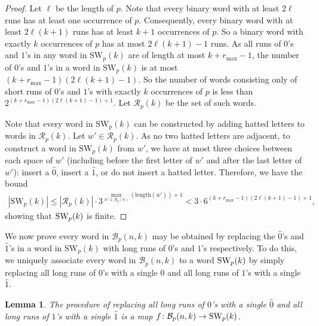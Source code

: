 \documentclass[11pt]{amsart}
\newtheorem{lemma}[theorem]{Lemma}
\newcommand{\hatted}[1]{\widehat{#1}}
\begin{document}
\begin{proof}
    Let $\ell$ be the length of $p$. Note that every binary word with at least $2\ell$ runs has at least one occurrence of $p$. Consequently, every binary word with at least $2\ell(k+1)$ runs has at least $k+1$ occurrences of $p$. So a binary word with exactly $k$ occurrences of $p$ has at most $2\ell(k+1)-1$ runs. As all runs of $0$'s and $1$'s in any word in $\text{SW}_{p}(k)$ are of length at most $k+r_{\max}-1$, the number of $0$'s and $1$'s in a word in $\text{SW}_{p}(k)$ is at most $(k+r_{\max}-1)(2\ell(k+1)-1)$. So the number of words consisting only of short runs of $0$'s and $1$'s with exactly $k$ occurrences of $p$ is less than $2^{(k+r_{\max}-1)(2\ell(k+1)-1)+1}$. Let $\mathcal{R}_p(k)$ be the set of such words.

    Note that every word in $\text{SW}_{p}(k)$ can be constructed by adding hatted letters to words in $\mathcal{R}_p(k)$. Let $w'\in\mathcal{R}_p(k)$. As no two hatted letters are adjacent, to construct a word in $\text{SW}_{p}(k)$ from $w'$, we have at most three choices between each space of $w'$ (including before the first letter of $w'$ and after the last letter of $w'$): insert a $\hatted{0}$, insert a $\hatted{1}$, or do not insert a hatted letter. Therefore, we have the bound
    \begin{align*}
        |\text{SW}_p(k)|\leq |\mathcal{R}_p(k)|\cdot 3^{\max_{w'\in \mathcal{R}_p(k)}(\text{length}(w'))+1}< 3\cdot6^{(k+r_{\max}-1)(2\ell(k+1)-1)+1},
    \end{align*}
    showing that $\text{\normalfont SW}_p(k)$ is finite.
    \end{proof}

We now prove every word in $\mathcal{B}_p(n,k)$ may be obtained by replacing the $\hatted{0}$'s and $\hatted{1}$'s in a word in $\text{SW}_p(k)$ with long runs of $0$'s and $1$'s respectively. To do this, we uniquely associate every word in $\mathcal{B}_{p}(n,k)$ to a word $\text{\normalfont SW}_p(k)$ by simply replacing all long runs of $0$'s with a single $\hatted{0}$ and all long runs of $1$'s with a single $\hatted{1}$.

\begin{lemma}\label{long_run_replacement_map}
    The procedure of replacing all long runs of $0$'s with a single $\hatted{0}$ and all long runs of $1$'s with a single $\hatted{1}$ is a map $f\colon\mathcal{B}_{p}(n,k)\to\text{\normalfont SW}_p(k)$.
\end{lemma}
\end{document}
